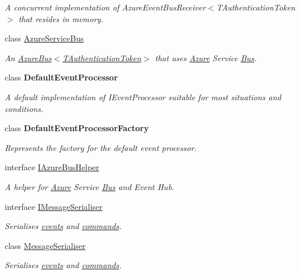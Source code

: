 \begin{DoxyCompactItemize}
\begin{DoxyCompactList}\small\item\em A concurrent implementation of Azure\+Event\+Bus\+Receiver$<$\+T\+Authentication\+Token$>$ that resides in memory. \end{DoxyCompactList}\item 
class \hyperlink{classCqrs_1_1Azure_1_1ServiceBus_1_1AzureServiceBus}{Azure\+Service\+Bus}
\begin{DoxyCompactList}\small\item\em An \hyperlink{classCqrs_1_1Azure_1_1ServiceBus_1_1AzureBus_a1046ff74282fd178f43e28420433d2a9_a1046ff74282fd178f43e28420433d2a9}{Azure\+Bus$<$\+T\+Authentication\+Token$>$} that uses \hyperlink{namespaceCqrs_1_1Azure}{Azure} Service \hyperlink{namespaceCqrs_1_1Bus}{Bus}. \end{DoxyCompactList}\item 
class {\bfseries Default\+Event\+Processor}
\begin{DoxyCompactList}\small\item\em A default implementation of I\+Event\+Processor suitable for most situations and conditions. \end{DoxyCompactList}\item 
class {\bfseries Default\+Event\+Processor\+Factory}
\begin{DoxyCompactList}\small\item\em Represents the factory for the default event processor. \end{DoxyCompactList}\item 
interface \hyperlink{interfaceCqrs_1_1Azure_1_1ServiceBus_1_1IAzureBusHelper}{I\+Azure\+Bus\+Helper}
\begin{DoxyCompactList}\small\item\em A helper for \hyperlink{namespaceCqrs_1_1Azure}{Azure} Service \hyperlink{namespaceCqrs_1_1Bus}{Bus} and Event Hub. \end{DoxyCompactList}\item 
interface \hyperlink{interfaceCqrs_1_1Azure_1_1ServiceBus_1_1IMessageSerialiser}{I\+Message\+Serialiser}
\begin{DoxyCompactList}\small\item\em Serialises \hyperlink{}{events} and \hyperlink{}{commands}. \end{DoxyCompactList}\item 
class \hyperlink{classCqrs_1_1Azure_1_1ServiceBus_1_1MessageSerialiser}{Message\+Serialiser}
\begin{DoxyCompactList}\small\item\em Serialises \hyperlink{}{events} and \hyperlink{}{commands}. \end{DoxyCompactList}\end{DoxyCompactItemize}
